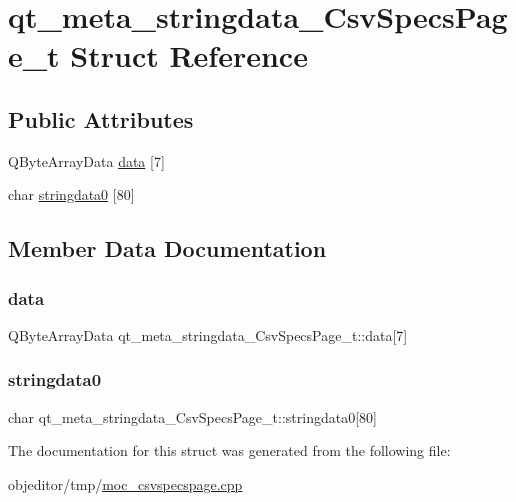 \hypertarget{structqt__meta__stringdata___csv_specs_page__t}{}\section{qt\+\_\+meta\+\_\+stringdata\+\_\+\+Csv\+Specs\+Page\+\_\+t Struct Reference}
\label{structqt__meta__stringdata___csv_specs_page__t}
\subsection*{Public Attributes}
\begin{DoxyCompactItemize}
\item 
Q\+Byte\+Array\+Data \mbox{\hyperlink{structqt__meta__stringdata___csv_specs_page__t_a6e4cb9e8147d704eccc46994b8838b2b}{data}} \mbox{[}7\mbox{]}
\item 
char \mbox{\hyperlink{structqt__meta__stringdata___csv_specs_page__t_a88bdad901aa4aeb584fd396d69517d4c}{stringdata0}} \mbox{[}80\mbox{]}
\end{DoxyCompactItemize}


\subsection{Member Data Documentation}
\mbox{\label{structqt__meta__stringdata___csv_specs_page__t_a6e4cb9e8147d704eccc46994b8838b2b}} 
\subsubsection{\texorpdfstring{data}{data}}
{\footnotesize\ttfamily Q\+Byte\+Array\+Data qt\+\_\+meta\+\_\+stringdata\+\_\+\+Csv\+Specs\+Page\+\_\+t\+::data\mbox{[}7\mbox{]}}

\mbox{\label{structqt__meta__stringdata___csv_specs_page__t_a88bdad901aa4aeb584fd396d69517d4c}} 
\subsubsection{\texorpdfstring{stringdata0}{stringdata0}}
{\footnotesize\ttfamily char qt\+\_\+meta\+\_\+stringdata\+\_\+\+Csv\+Specs\+Page\+\_\+t\+::stringdata0\mbox{[}80\mbox{]}}



The documentation for this struct was generated from the following file\+:\begin{DoxyCompactItemize}
\item 
objeditor/tmp/\mbox{\hyperlink{moc__csvspecspage_8cpp}{moc\+\_\+csvspecspage.\+cpp}}\end{DoxyCompactItemize}
